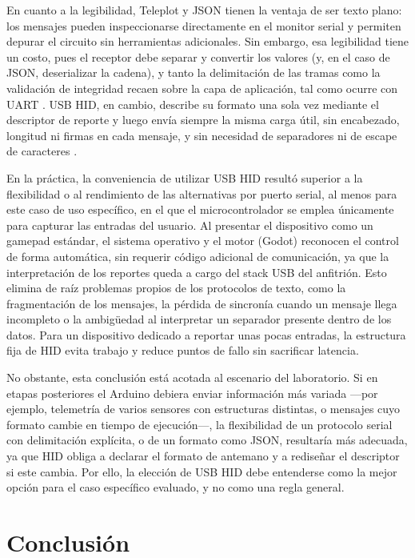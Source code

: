 \documentclass[journal]{IEEEtran}
\begin{document}
En cuanto a la legibilidad, Teleplot y JSON tienen la ventaja de ser texto plano: los mensajes pueden inspeccionarse directamente en el monitor serial y permiten depurar el circuito sin herramientas adicionales. Sin embargo, esa legibilidad tiene un costo, pues el receptor debe separar y convertir los valores (y, en el caso de JSON, deserializar la cadena), y tanto la delimitación de las tramas como la validación de integridad recaen sobre la capa de aplicación, tal como ocurre con UART \cite{tanenbaum2012}. USB HID, en cambio, describe su formato una sola vez mediante el descriptor de reporte y luego envía siempre la misma carga útil, sin encabezado, longitud ni firmas en cada mensaje, y sin necesidad de separadores ni de escape de caracteres \cite{usbhid}.

En la práctica, la conveniencia de utilizar USB HID resultó superior a la flexibilidad o al rendimiento de las alternativas por puerto serial, al menos para este caso de uso específico, en el que el microcontrolador se emplea únicamente para capturar las entradas del usuario. Al presentar el dispositivo como un gamepad estándar, el sistema operativo y el motor (Godot) reconocen el control de forma automática, sin requerir código adicional de comunicación, ya que la interpretación de los reportes queda a cargo del stack USB del anfitrión. Esto elimina de raíz problemas propios de los protocolos de texto, como la fragmentación de los mensajes, la pérdida de sincronía cuando un mensaje llega incompleto o la ambigüedad al interpretar un separador presente dentro de los datos. Para un dispositivo dedicado a reportar unas pocas entradas, la estructura fija de HID evita trabajo y reduce puntos de fallo sin sacrificar latencia.

No obstante, esta conclusión está acotada al escenario del laboratorio. Si en etapas posteriores el Arduino debiera enviar información más variada ---por ejemplo, telemetría de varios sensores con estructuras distintas, o mensajes cuyo formato cambie en tiempo de ejecución---, la flexibilidad de un protocolo serial con delimitación explícita, o de un formato como JSON, resultaría más adecuada, ya que HID obliga a declarar el formato de antemano y a rediseñar el descriptor si este cambia. Por ello, la elección de USB HID debe entenderse como la mejor opción para el caso específico evaluado, y no como una regla general.




\section{Conclusión}
\end{document}
